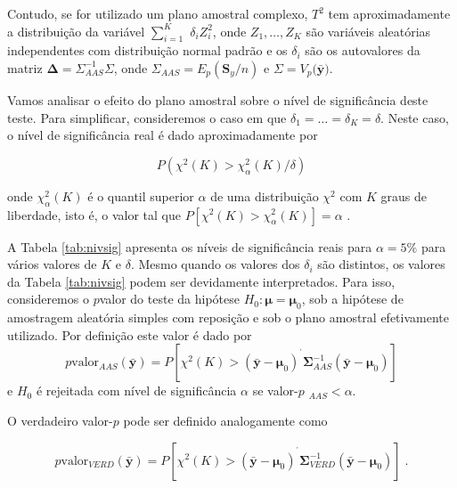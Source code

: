 \documentclass[]{book}
\theoremstyle{definition}
\theoremstyle{definition}
\theoremstyle{definition}
\theoremstyle{remark}
\begin{document}
Contudo, se for utilizado um plano amostral complexo, \(T^{2}\) tem
aproximadamente a distribuição da variável \(\sum\limits_{i=1}^{K}\)
\(\delta _{i}Z_{i}^{2}\), onde \(Z_{1},\ldots ,Z_{K}\) são variáveis
aleatórias independentes com distribuição normal padrão e os
\(\delta _{i}\) são os autovalores da matriz
\(\mathbf{\Delta }=\Sigma _{AAS}^{-1}\Sigma\), onde
\(\Sigma _{AAS}=E_{p}(\mathbf{S}_{y}/n)\) e
\(\Sigma =V_{p}(\mathbf{\bar{y})}\).

Vamos analisar o efeito do plano amostral sobre o nível de significância
deste teste. Para simplificar, consideremos o caso em que
\(\delta _{1}=\ldots =\delta _{K}=\delta\). Neste caso, o nível de
significância real é dado aproximadamente por

\begin{equation}
P\left(\chi ^{2}\left( K\right) >\chi _{\alpha }^{2}\left( K\right) /\delta\right)  \label{eq:epa12}
\end{equation}

onde \(\chi _{\alpha }^{2}\left( K\right)\) é o quantil superior
\(\alpha\) de uma distribuição \(\chi ^{2}\) com \(K\) graus de
liberdade, isto é, o valor tal que
\(P\left[ \chi ^{2}\left( K\right) >\chi _{\alpha}^{2}\left( K\right) \right] =\alpha\)
.

A Tabela \ref{tab:nivsig} apresenta os níveis de significância reais
para \(\alpha =5\%\) para vários valores de \(K\) e \(\delta\). Mesmo
quando os valores dos \(\delta _{i}\) são distintos, os valores da
Tabela \ref{tab:nivsig} podem ser devidamente interpretados. Para isso,
consideremos o \(p\)valor do teste da hipótese
\(H_{0}:\mathbf{\mu }=\mathbf{\mu }_{0}\), sob a hipótese de amostragem
aleatória simples com reposição e sob o plano amostral efetivamente
utilizado. Por definição este valor é dado por \[
p\mbox{valor}_{AAS}\left( \mathbf{\bar{y}}\right) =P\left[ \chi ^{2}\left(
K\right) >\left( \mathbf{\bar{y}-\mu }_{0}\right) ^{^{\prime }}\mathbf{
\Sigma }_{AAS}^{-1}\left( \mathbf{\bar{y}-\mu }_{0}\right) \right] 
\] e \(H_{0}\) é rejeitada com nível de significância \(\alpha\) se
valor-\(p\) \(_{AAS}<\alpha\).

O verdadeiro valor-\(p\) pode ser definido analogamente como

\begin{equation}
p\mbox{valor}_{VERD}\left( \mathbf{\bar{y}}\right) =P\left[ \chi ^{2}\left(K\right) >\left( \mathbf{\bar{y}-\mu }_{0}\right) ^{^{\prime }}\mathbf{\Sigma }_{VERD}^{-1}\left( \mathbf{\bar{y}-\mu }_{0}\right) \right] \;.
\label{eq:epa13}
\end{equation}
\end{document}
